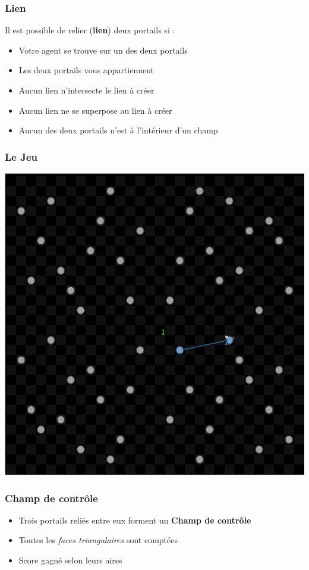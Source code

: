 \documentclass{beamer}
\begin{document}
\begin{frame}
	\frametitle{Lien}
    Il est possible de relier (\textbf{lien}) deux portails si :
	\begin{itemize}
        \item Votre agent se trouve sur un des deux portails
        \item Les deux portails vous appartiennent
        \item Aucun lien n'intersecte le lien à créer
        \item Aucun lien ne se superpose au lien à créer
        \item Aucun des deux portails n'est à l'intérieur d'un champ
	\end{itemize}
\end{frame}

\begin{frame}
    \begin{center}
        \frametitle{Le Jeu}
        \includegraphics[height=0.8\textheight]{gui_link}
    \end{center}
\end{frame}


\begin{frame}
	\frametitle{Champ de contrôle}
    \begin{itemize}
        \item Trois portails reliés entre eux forment un \textbf{Champ de contrôle}
        \item Toutes les \emph{faces triangulaires} sont comptées
        \item Score gagné selon leurs aires
    \end{itemize}
\end{frame}
\end{document}
